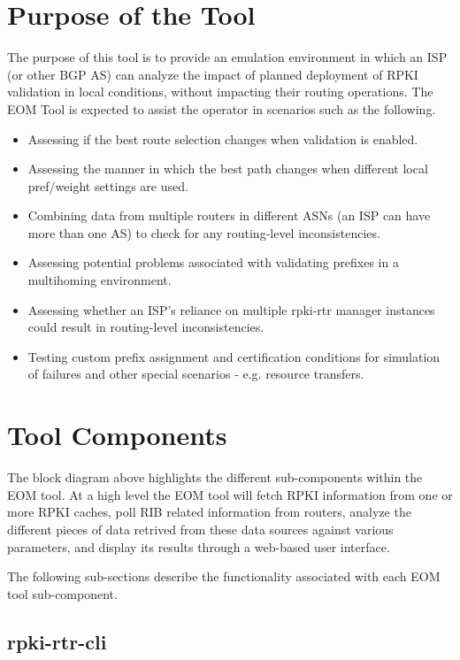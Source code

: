 \section{Purpose of the Tool}

The purpose of this tool is to provide an emulation environment in which
an ISP (or other BGP AS) can analyze the impact of planned deployment of
RPKI validation in local conditions, without impacting their routing
operations. The EOM Tool is expected to assist the operator in scenarios 
such as the following. 

\begin{itemize}
	\item Assessing if the best route selection changes when validation is enabled.
	\item Assessing the manner in which the best path changes when different local pref/weight settings are used.
	\item Combining data from multiple routers in different ASNs (an ISP can have more than one AS) to check for any routing-level inconsistencies.
	\item Assessing potential problems associated with validating prefixes in a multihoming environment.
	\item Assessing whether an ISP's reliance on multiple rpki-rtr manager instances could result in routing-level inconsistencies.
	\item Testing custom prefix assignment and certification conditions for simulation of failures and other special scenarios - e.g. resource transfers.
\end{itemize}

\section{Tool Components}


The block diagram above highlights the different sub-components within
the EOM tool. At a high level the EOM tool will fetch RPKI information
from one or more RPKI caches, poll RIB related information from
routers, analyze the different pieces of data retrived from these data
sources against various parameters, and display its results through a
web-based user interface.  

The following sub-sections describe the functionality associated with
each EOM tool sub-component.

\subsection{rpki-rtr-cli}


